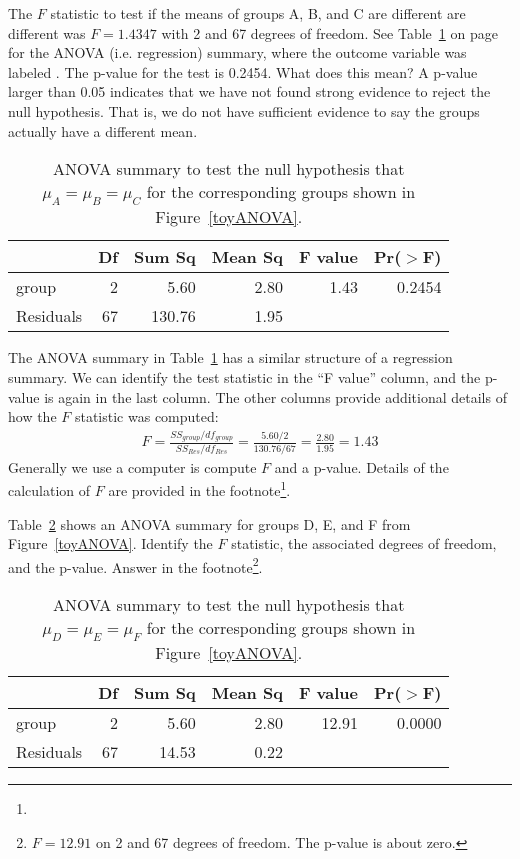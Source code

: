 \begin{example}{The $F$ statistic to test if the means of groups A, B, and C are different are different was $F=1.4347$ with 2 and 67 degrees of freedom. See Table~\ref{toyANOVAabcOutput} on page~\pageref{toyANOVAabcOutput} for the ANOVA (i.e. regression) summary, where the outcome variable was labeled . The p-value for the test is 0.2454. What does this mean?}
A p-value larger than 0.05 indicates that we have not found strong evidence to reject the null hypothesis. That is, we do not have sufficient evidence to say the groups actually have a different mean.
\end{example}
\begin{table}[ht]
\centering
\begin{tabular}{lrrrrr}
  \hline
 & Df & Sum Sq & Mean Sq & F value & Pr($>$F) \\ 
  \hline
group & 2 & 5.60 & 2.80 & 1.43 & 0.2454 \\ 
  Residuals & 67 & 130.76 & 1.95 &  &  \\ 
   \hline
\end{tabular}
\caption{ANOVA summary to test the null hypothesis that $\mu_A = \mu_B = \mu_C$ for the corresponding groups shown in Figure~\ref{toyANOVA}.}
\label{toyANOVAabcOutput}
\end{table}

The ANOVA summary in Table~\ref{toyANOVAabcOutput} has a similar structure of a regression summary. We can identify the test statistic in the ``F value'' column, and the p-value is again in the last column. The other columns provide additional details of how the $F$ statistic was computed:
\begin{align*}
F = \frac{SS_{group} / df_{group}}{SS_{Res} / df_{Res}} =  \frac{5.60 / 2}{130.76 / 67} = \frac{2.80}{1.95} = 1.43
\end{align*}
Generally we use a computer is compute $F$ and a p-value. Details of the calculation of $F$ are provided in the footnote\footnote{\sumOfSquaresExplanationForFootnote}.

\begin{exercise}
Table~\ref{toyANOVAdefOutput} shows an ANOVA summary for groups D, E, and F from Figure~\ref{toyANOVA}. Identify the $F$ statistic, the associated degrees of freedom, and the p-value. Answer in the footnote\footnote{$F=12.91$ on 2 and 67 degrees of freedom. The p-value is about zero.}.
\end{exercise}
\begin{table}[ht]
\centering
\begin{tabular}{lrrrrr}
  \hline
 & Df & Sum Sq & Mean Sq & F value & Pr($>$F) \\ 
  \hline
group & 2 & 5.60 & 2.80 & 12.91 & 0.0000 \\ 
  Residuals & 67 & 14.53 & 0.22 &  &  \\ 
   \hline
\end{tabular}
\caption{ANOVA summary to test the null hypothesis that $\mu_D = \mu_E = \mu_F$ for the corresponding groups shown in Figure~\ref{toyANOVA}.}
\label{toyANOVAdefOutput}
\end{table}

